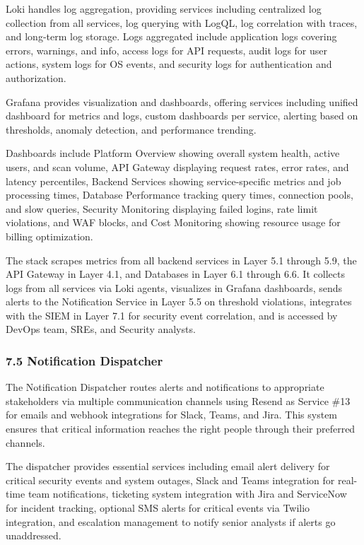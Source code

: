 \documentclass[12pt,a4paper]{report}
\begin{document}
Loki handles log aggregation, providing services including centralized log collection from all services, log querying with LogQL, log correlation with traces, and long-term log storage. Logs aggregated include application logs covering errors, warnings, and info, access logs for API requests, audit logs for user actions, system logs for OS events, and security logs for authentication and authorization.

Grafana provides visualization and dashboards, offering services including unified dashboard for metrics and logs, custom dashboards per service, alerting based on thresholds, anomaly detection, and performance trending.

Dashboards include Platform Overview showing overall system health, active users, and scan volume, API Gateway displaying request rates, error rates, and latency percentiles, Backend Services showing service-specific metrics and job processing times, Database Performance tracking query times, connection pools, and slow queries, Security Monitoring displaying failed logins, rate limit violations, and WAF blocks, and Cost Monitoring showing resource usage for billing optimization.

The stack scrapes metrics from all backend services in Layer 5.1 through 5.9, the API Gateway in Layer 4.1, and Databases in Layer 6.1 through 6.6. It collects logs from all services via Loki agents, visualizes in Grafana dashboards, sends alerts to the Notification Service in Layer 5.5 on threshold violations, integrates with the SIEM in Layer 7.1 for security event correlation, and is accessed by DevOps team, SREs, and Security analysts.

\subsubsection{7.5 Notification Dispatcher}

The Notification Dispatcher routes alerts and notifications to appropriate stakeholders via multiple communication channels using Resend as Service \#13 for emails and webhook integrations for Slack, Teams, and Jira. This system ensures that critical information reaches the right people through their preferred channels.

The dispatcher provides essential services including email alert delivery for critical security events and system outages, Slack and Teams integration for real-time team notifications, ticketing system integration with Jira and ServiceNow for incident tracking, optional SMS alerts for critical events via Twilio integration, and escalation management to notify senior analysts if alerts go unaddressed.
\end{document}
